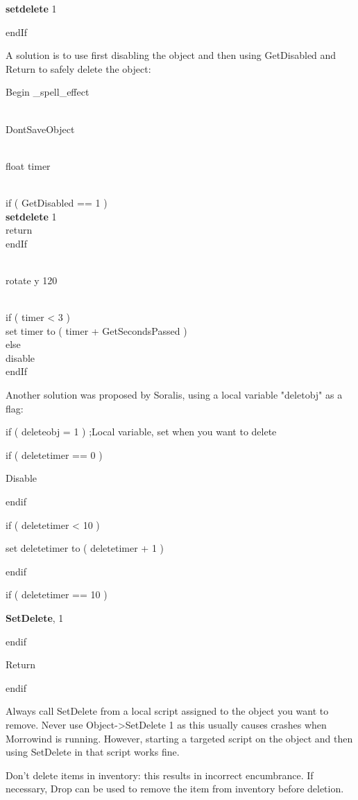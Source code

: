 \documentclass[
]{article}
\begin{document}
\textbf{setdelete} 1

endIf

A solution is to use first disabling the object and then using
GetDisabled and Return to safely delete the object:

Begin \_spell\_effect\\
\strut \\
DontSaveObject\\
\strut \\
float timer\\
\strut \\
if ( GetDisabled == 1 )\\
\textbf{setdelete} 1\\
return\\
endIf\\
\strut \\
rotate y 120\\
\strut \\
if ( timer \textless{} 3 )\\
set timer to ( timer + GetSecondsPassed )\\
else\\
disable\\
endIf

Another solution was proposed by Soralis, using a local variable
"deletobj" as a flag:

if ( deleteobj = 1 ) ;Local variable, set when you want to delete

if ( deletetimer == 0 )

Disable

endif

if ( deletetimer \textless{} 10 )

set deletetimer to ( deletetimer + 1 )

endif

if ( deletetimer == 10 )

\textbf{SetDelete}, 1

endif

Return

endif

Always call SetDelete from a local script assigned to the object you
want to remove. Never use Object-\textgreater SetDelete 1 as this
usually causes crashes when Morrowind is running. However, starting a
targeted script on the object and then using SetDelete in that script
works fine.

Don't delete items in inventory: this results in incorrect encumbrance.
If necessary, Drop can be used to remove the item from inventory before
deletion.
\end{document}
